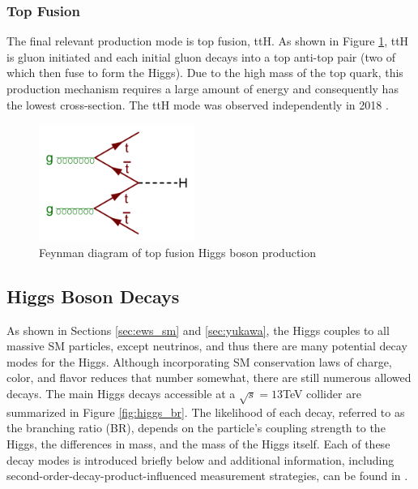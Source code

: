 \subsubsection{Top Fusion}
The final relevant production mode is top fusion, ttH. As shown in Figure \ref{fig:tth}, ttH is gluon initiated and each initial gluon decays into a top anti-top pair (two of which then fuse to form the Higgs). Due to the high mass of the top quark, this production mechanism requires a large amount of energy and consequently has the lowest cross-section. The ttH mode was observed independently in 2018 \cite{tth}. 

\begin{figure}[h]
    \centering
    \includegraphics[width=2in]{figures/chapter1/tth.png}
    \caption{Feynman diagram of top fusion Higgs boson production}
    \label{fig:tth}
\end{figure}

\subsection{Higgs Boson Decays}
As shown in Sections \ref{sec:ews_sm} and \ref{sec:yukawa}, the Higgs couples to all massive SM particles, except neutrinos, and thus there are many potential decay modes for the Higgs. Although incorporating SM conservation laws of charge, color, and flavor reduces that number somewhat, there are still numerous allowed decays. The main Higgs decays accessible at a $\sqrt{s}=13$TeV collider are summarized in Figure \ref{fig:higgs_br}. The likelihood of each decay, referred to as the branching ratio (BR), depends on the particle's coupling strength to the Higgs, the differences in mass, and the mass of the Higgs itself. Each of these decay modes is introduced briefly below and additional information, including second-order-decay-product-influenced measurement strategies, can be found in \cite{pdg}.\\

